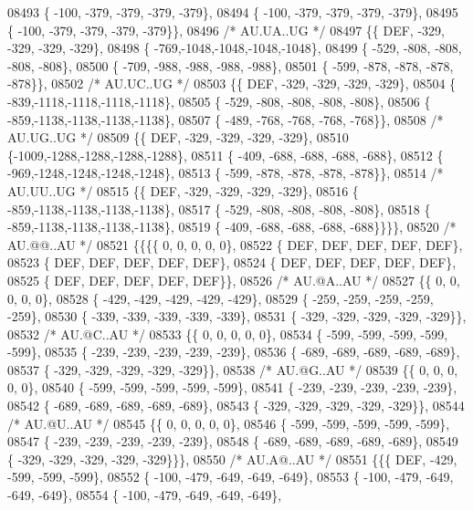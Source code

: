 \begin{DoxyCode}
08493 \{ -100, -379, -379, -379, -379\},
08494 \{ -100, -379, -379, -379, -379\},
08495 \{ -100, -379, -379, -379, -379\}\},
08496 \textcolor{comment}{/* AU.UA..UG */}
08497 \{\{  DEF, -329, -329, -329, -329\},
08498 \{ -769,-1048,-1048,-1048,-1048\},
08499 \{ -529, -808, -808, -808, -808\},
08500 \{ -709, -988, -988, -988, -988\},
08501 \{ -599, -878, -878, -878, -878\}\},
08502 \textcolor{comment}{/* AU.UC..UG */}
08503 \{\{  DEF, -329, -329, -329, -329\},
08504 \{ -839,-1118,-1118,-1118,-1118\},
08505 \{ -529, -808, -808, -808, -808\},
08506 \{ -859,-1138,-1138,-1138,-1138\},
08507 \{ -489, -768, -768, -768, -768\}\},
08508 \textcolor{comment}{/* AU.UG..UG */}
08509 \{\{  DEF, -329, -329, -329, -329\},
08510 \{-1009,-1288,-1288,-1288,-1288\},
08511 \{ -409, -688, -688, -688, -688\},
08512 \{ -969,-1248,-1248,-1248,-1248\},
08513 \{ -599, -878, -878, -878, -878\}\},
08514 \textcolor{comment}{/* AU.UU..UG */}
08515 \{\{  DEF, -329, -329, -329, -329\},
08516 \{ -859,-1138,-1138,-1138,-1138\},
08517 \{ -529, -808, -808, -808, -808\},
08518 \{ -859,-1138,-1138,-1138,-1138\},
08519 \{ -409, -688, -688, -688, -688\}\}\}\},
08520 \textcolor{comment}{/* AU.@@..AU */}
08521 \{\{\{\{    0,    0,    0,    0,    0\},
08522 \{  DEF,  DEF,  DEF,  DEF,  DEF\},
08523 \{  DEF,  DEF,  DEF,  DEF,  DEF\},
08524 \{  DEF,  DEF,  DEF,  DEF,  DEF\},
08525 \{  DEF,  DEF,  DEF,  DEF,  DEF\}\},
08526 \textcolor{comment}{/* AU.@A..AU */}
08527 \{\{    0,    0,    0,    0,    0\},
08528 \{ -429, -429, -429, -429, -429\},
08529 \{ -259, -259, -259, -259, -259\},
08530 \{ -339, -339, -339, -339, -339\},
08531 \{ -329, -329, -329, -329, -329\}\},
08532 \textcolor{comment}{/* AU.@C..AU */}
08533 \{\{    0,    0,    0,    0,    0\},
08534 \{ -599, -599, -599, -599, -599\},
08535 \{ -239, -239, -239, -239, -239\},
08536 \{ -689, -689, -689, -689, -689\},
08537 \{ -329, -329, -329, -329, -329\}\},
08538 \textcolor{comment}{/* AU.@G..AU */}
08539 \{\{    0,    0,    0,    0,    0\},
08540 \{ -599, -599, -599, -599, -599\},
08541 \{ -239, -239, -239, -239, -239\},
08542 \{ -689, -689, -689, -689, -689\},
08543 \{ -329, -329, -329, -329, -329\}\},
08544 \textcolor{comment}{/* AU.@U..AU */}
08545 \{\{    0,    0,    0,    0,    0\},
08546 \{ -599, -599, -599, -599, -599\},
08547 \{ -239, -239, -239, -239, -239\},
08548 \{ -689, -689, -689, -689, -689\},
08549 \{ -329, -329, -329, -329, -329\}\}\},
08550 \textcolor{comment}{/* AU.A@..AU */}
08551 \{\{\{  DEF, -429, -599, -599, -599\},
08552 \{ -100, -479, -649, -649, -649\},
08553 \{ -100, -479, -649, -649, -649\},
08554 \{ -100, -479, -649, -649, -649\},

\end{DoxyCode}
